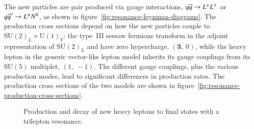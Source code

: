 The new particles are pair produced via gauge interactions, $q\overline{q}\rightarrow L^{\pm}L^{\mp}$ or $q\overline{q}'\rightarrow L^{\pm}N^{0}$, as shown in figure~\ref{fig:resonance-feynman-diagrams}. The production cross sections depend on how the new particles couple to $\mathrm{SU}(2)_L\times \mathrm{U}(1)_Y$: the type~III seesaw fermions transform in the adjoint representation of $\mathrm{SU}(2)_L$ and have zero hypercharge, $(\mathbf{3},\ 0)$, while the heavy lepton in the generic vector-like lepton model inherits its gauge couplings from its $\mathrm{SU}(5)$ multiplet, $(1,\ -1)$.  The different gauge couplings, plus the various production modes, lead to significant differences in production rates. The production cross sections of the two models are shown in figure~\ref{fig:resonance-production-cross-sections}.

\begin{figure}[htbp]
  \centering
  \caption{Production and decay of new heavy leptons to final states with a trilepton resonance.}
  \label{fig:heavy-lepton-feynman-diagrams}
\end{figure}

